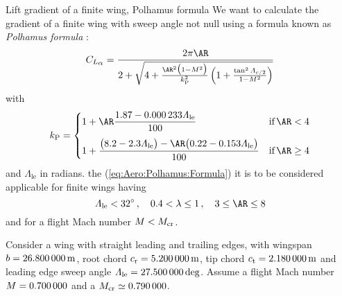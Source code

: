 \documentclass[[12pt,twoside]{book}
\begin{document}
%

%
\begin{myExampleX}{Lift gradient of a finite wing, Polhamus formula}{}%
\label{example:Lift:Gradient:Polhamus:Formula}
%
\noindent
We want to calculate the gradient  of a finite wing
with sweep angle not null using a formula known as \emph{Polhamus formula }:
\begin{equation}\label{eq:Aero:Polhamus:Formula}
C_{L_{\mathlarger{\alpha}}} = 
   \frac{ 2\pi\AR
   }{
      2 + \sqrt{ 4+ \frac{\AR^2 \big(1-M^2\big)}{k_\mathrm{P}^2}\left({1+\frac{\tan^2\Lambda_{c/2}}{1-M^2}} \right) }
   }
\end{equation}
with
\begin{equation}\label{eq:Aero:K:Polhamus:Formula}
k_\mathrm{P}={
   \begin{cases}      1+\AR\dfrac{\num[round-precision=2]{1.87}-\num[round-precision=6]{0.000233}\Lambda_\mathrm{le}}{\num[round-precision=0]{100}}
      & \text{if}\, \AR<4
      \\[1em]
      1+\dfrac{
         \big(\num[round-precision=1]{8.2}-\num[round-precision=1]{2.3}\Lambda_\mathrm{le}\big)
         - \AR\big(\num[round-precision=2]{0.22}-\num[round-precision=3]{0.153}\Lambda_\mathrm{le}\big)
         }{\num[round-precision=0]{100}}
      & \text{if}\, \AR \ge 4
   \end{cases}
}
\end{equation}
and $\Lambda_\text{le}$ in radians.
the (\ref{eq:Aero:Polhamus:Formula}) it is to be considered applicable for finite wings
having
\begin{equation}\label{eq:Aero:Limitations:Polhamus:Formula}
\Lambda_\mathrm{le} < \SI[round-precision=0]{32}{\degree}
\,,\quad
\SI[round-precision=1]{0.4}{} < \lambda \le 1
\,,\quad
3 \le \AR \le 8
\end{equation}
and for a flight Mach number $\Mach < \Mach_\mathrm{cr}$.

Consider a wing with straight leading and trailing edges,
with wingspan $b=\SI[round-precision=1]{\mySpanWingMT}{\metre}$,
root chord $c_\mathrm{r}=\SI[round-precision=2]{\myChordRootWingMT}{\metre}$,
tip chord $c_\mathrm{t}=\SI[round-precision=2]{\myChordTipWingMT}{\metre}$
and leading edge sweep angle
$\Lambda_\mathrm{le}=\SI[round-precision=1]{\mySweepLEWingDEG}{\deg}$.
Assume a flight Mach number $\Mach=\SI[round-precision=1]{\myMach}{}$
and a $\Mach_\mathrm{cr}\simeq\SI[round-precision=2]{\myCriticalMachNumberMACWing}{}$.


\end{myExampleX}
\end{document}
